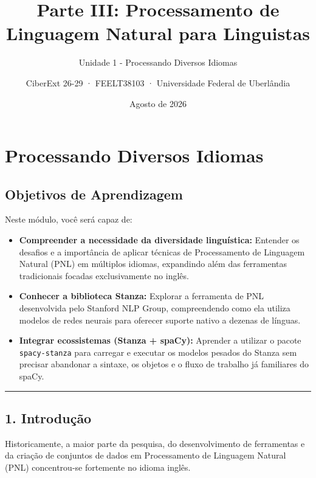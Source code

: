 \documentclass[
  brazilian,
]{article}
\title{Parte III: Processamento de Linguagem Natural para Linguistas}
\subtitle{Unidade 1 - Processando Diversos Idiomas}
\author{CiberExt 26-29 · FEELT38103 · Universidade Federal de
Uberlândia}
\date{Agosto de 2026}
\providecommand{\tightlist}{%
  \setlength{\itemsep}{0pt}\setlength{\parskip}{0pt}}
\begin{document}
\maketitle

\hypertarget{processando-diversos-idiomas}{%
\section{Processando Diversos
Idiomas}\label{processando-diversos-idiomas}}

\hypertarget{objetivos-de-aprendizagem}{%
\subsection{Objetivos de Aprendizagem}\label{objetivos-de-aprendizagem}}

Neste módulo, você será capaz de:

\begin{itemize}
\tightlist
\item
  \textbf{Compreender a necessidade da diversidade linguística:}
  Entender os desafios e a importância de aplicar técnicas de
  Processamento de Linguagem Natural (PNL) em múltiplos idiomas,
  expandindo além das ferramentas tradicionais focadas exclusivamente no
  inglês.
\item
  \textbf{Conhecer a biblioteca Stanza:} Explorar a ferramenta de PNL
  desenvolvida pelo Stanford NLP Group, compreendendo como ela utiliza
  modelos de redes neurais para oferecer suporte nativo a dezenas de
  línguas.
\item
  \textbf{Integrar ecossistemas (Stanza + spaCy):} Aprender a utilizar o
  pacote \texttt{spacy-stanza} para carregar e executar os modelos
  pesados do Stanza sem precisar abandonar a sintaxe, os objetos e o
  fluxo de trabalho já familiares do spaCy.
\end{itemize}

\begin{center}\rule{0.5\linewidth}{0.5pt}\end{center}

\hypertarget{introduuxe7uxe3o}{%
\subsection{1. Introdução}\label{introduuxe7uxe3o}}

Historicamente, a maior parte da pesquisa, do desenvolvimento de
ferramentas e da criação de conjuntos de dados em Processamento de
Linguagem Natural (PNL) concentrou-se fortemente no idioma inglês.
\end{document}
